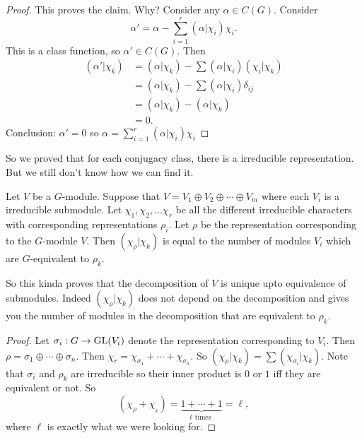 \begin{proof}
    This proves the claim. 
    Why?
    Consider any $\alpha \in C(G)$.
    Consider
    \[
        \alpha' = \alpha - \sum_{i=1}^{r}(\alpha | \chi_{i}) \chi_{i}
    .\] 
    This is a class function, so $\alpha' \in C(G)$.
    Then 
    \begin{align*}
        (\alpha' | \chi_{k})
        &= (\alpha | \chi_{k}) - \sum (\alpha | \chi_{i}) (\chi_{i} | \chi_{k})\\
        &= (\alpha | \chi_{k}) - \sum (\alpha | \chi_{i}) \delta_{ij}\\
        &= (\alpha | \chi_{k}) - (\alpha| \chi_{k})\\
        & = 0
    .\end{align*} 
    Conclusion: $\alpha' = 0$ so  $\alpha = \sum_{i=1}^{r} (\alpha | \chi_{i}) \chi_{i}$
\end{proof}

So we proved that for each conjugacy class, there is a irreducible representation. But we still don't know how we can find it.


\begin{corollary}
    Let $V$ be a $G$-module. Suppose that $V = V_1 \oplus V_2 \oplus \cdots \oplus V_m$ where each $V_i$ is a irreducible submodule.
    Let $\chi_{1}, \chi_{2}, \ldots \chi_{r}$ be all the different irreducible characters with corresponding representations $\rho_i$.
    Let $\rho$ be the representation corresponding to the  $G$-module $V$.
    Then $(\chi_{\rho} | \chi_k)$ is equal to the number of modules $V_i$ which are  $G$-equivalent to $\rho_k$.
\end{corollary}

So this kinda proves that the decomposition of $V$ is unique upto equivalence of submodules. Indeed $(\chi_{\rho} | \chi_{k})$ does not depend on the decomposition and gives you the number of modules in the decomposition that are equivalent to $\rho_k$.

\begin{proof}
    Let $\sigma_i: G \to \operatorname{GL}(V_i)$ denote the representation corresponding to $V_i$.
    Then  $\rho = \sigma_1 \oplus \cdots \oplus \sigma_n$.
    Then $\chi_{r} = \chi_{\sigma_1} + \cdots + \chi_{\sigma_n}$.
    So $(\chi_{\rho} | \chi_{k}) = \sum (\chi_{\sigma_i}  | \chi_{k})$.
    Note that $\sigma_i$ and  $\rho_k$ are irreducible so their inner product is $0$ or $1$ iff they are equivalent or not. So
     \[
         (\chi_{\rho} + \chi_{_k}) = \underbrace{1 + \cdots + 1}_{\ell  \text{ times }} = \ell
    ,\] 
    where $\ell$ is exactly what we were looking for.
\end{proof}

